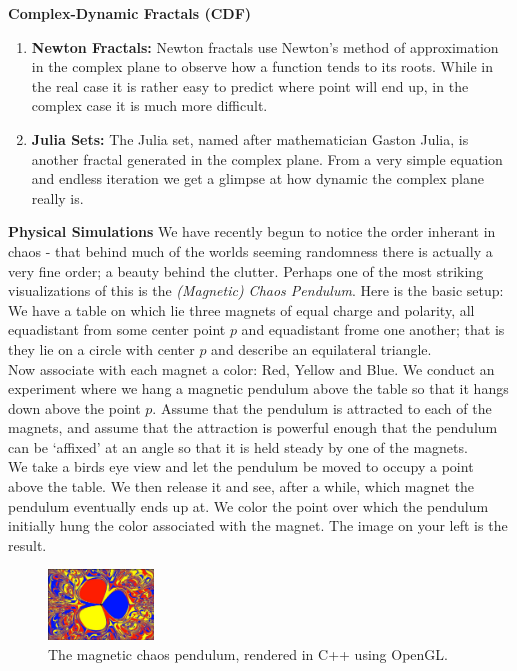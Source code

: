\documentclass[11pt,oneside,final]{article}
\begin{document}
\noindent\textbf{Complex-Dynamic Fractals (CDF)}
\begin{enumerate}[i]
	\item {\bf Newton Fractals:} Newton fractals use Newton's method of
		approximation in the complex plane to observe how a function tends to
		its roots.  While in the real case it is rather easy to predict where
		point will end up, in the complex case it is much more difficult.  
	\item {\bf Julia Sets:} The Julia set, named after mathematician Gaston
		Julia, is another fractal generated in the complex plane. From a very
		simple equation and endless iteration we get a glimpse at how dynamic
		the complex plane really is.
\end{enumerate}
\noindent\textbf{Physical Simulations} We have recently begun to notice the
order inherant in chaos - that behind much of the worlds seeming randomness
there is actually a very fine order; a beauty behind the clutter. Perhaps
one of the most striking visualizations of this is the {\em (Magnetic) Chaos 
Pendulum}. Here is the basic setup: We have a table on which lie three
magnets of equal charge and polarity, all equadistant from some center point
\(p\) and equadistant frome one another; that is they lie on a circle with
center \(p\) and describe an equilateral triangle.\\
Now associate with each magnet a color: Red, Yellow and Blue. We conduct
an experiment where we hang a magnetic pendulum above the table so that it
hangs down above the point \(p\). Assume that the pendulum is attracted to
each of the magnets, and assume that the attraction is powerful enough that 
the pendulum can be `affixed' at an angle so that it is held steady by one
of the magnets.\\
We take a birds eye view and let the pendulum be moved to occupy a point above
the table. We then release it and see, after a while, which magnet the pendulum
eventually ends up at. We color the point over which the pendulum initially hung
the color associated with the magnet. The image on your left is the result.

\begin{figure}
	\includegraphics[width=0.25\textwidth]{chaos_pendulum1}
	\caption{The magnetic chaos pendulum, rendered in C++ using OpenGL.}
\end{figure}
\end{document}

